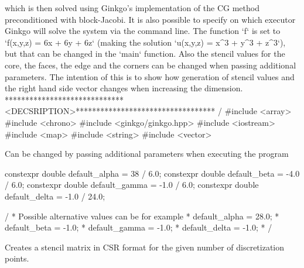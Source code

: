 \begin{DoxyCode}
which is then solved \textcolor{keyword}{using} Ginkgo\textcolor{stringliteral}{'s implementation of the CG method}
\textcolor{stringliteral}{preconditioned with block-Jacobi. It is also possible to specify on which}
\textcolor{stringliteral}{executor Ginkgo will solve the system via the command line.}
\textcolor{stringliteral}{The function `f` is set to `f(x,y,z) = 6x + 6y + 6z` (making the solution}
\textcolor{stringliteral}{`u(x,y,z) = x^3 + y^3 + z^3`), but that can be changed in the `main` function.}
\textcolor{stringliteral}{Also the stencil values for the core, the faces, the edge and the corners can be}
\textcolor{stringliteral}{changed when passing additional parameters.}
\textcolor{stringliteral}{}
\textcolor{stringliteral}{The intention of this is to show how generation of stencil values and the right}
\textcolor{stringliteral}{hand side vector changes when increasing the dimension.}
\textcolor{stringliteral}{*****************************<DECSRIPTION>********************************** /}
\textcolor{stringliteral}{}
\textcolor{stringliteral}{#include <array>}
\textcolor{stringliteral}{#include <chrono>}
\textcolor{stringliteral}{#include <ginkgo/ginkgo.hpp>}
\textcolor{stringliteral}{#include <iostream>}
\textcolor{stringliteral}{#include <map>}
\textcolor{stringliteral}{#include <string>}
\textcolor{stringliteral}{#include <vector>}
\end{DoxyCode}


Can be changed by passing additional parameters when executing the program


\begin{DoxyCode}
constexpr \textcolor{keywordtype}{double} default\_alpha = 38 / 6.0;
constexpr \textcolor{keywordtype}{double} default\_beta = -4.0 / 6.0;
constexpr \textcolor{keywordtype}{double} default\_gamma = -1.0 / 6.0;
constexpr \textcolor{keywordtype}{double} default\_delta = -1.0 / 24.0;

/ * Possible alternative values can be \textcolor{keywordflow}{for} example
 * default\_alpha = 28.0;
 * default\_beta = -1.0;
 * default\_gamma = -1.0;
 * default\_delta = -1.0;
 * /
\end{DoxyCode}


Creates a stencil matrix in C\+SR format for the given number of discretization points.


